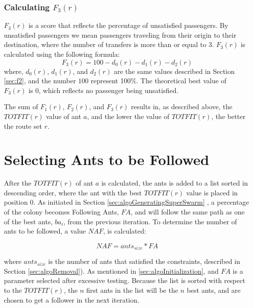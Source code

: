 \subsubsection{Calculating $F_{3}(r)$}
\label{sec:f3}
$F_3(r)$ is a score that reflects the percentage of unsatisfied passengers. By unsatisfied passengers we mean passengers traveling from their origin to their destination, where the number of transfers is more than or equal to 3. $F_3(r)$ is calculated using the following formula:
\newline
$$F_3(r) = 100 - d_0(r) - d_1(r) - d_2(r)$$
\newline
where, $d_0(r)$, $d_1(r)$, and $d_2(r)$ are the same values described in Section \vref{sec:f2}, and the number $100$ represent 100\%. The theoretical best value of $F_3(r)$ is 0, which reflects no passenger being unsatisfied. 

The sum of $F_{1}(r)$, $F_{2}(r)$, and $F_{3}(r)$ results in, as described above, the $TOTFIT(r)$ value of ant $a$, and the lower the value of $TOTFIT(r)$, the better the route set $r$. 

\section{Selecting Ants to be Followed}
\label{sec:selctingAntsToBeFollowed}

After the $TOTFIT(r)$ of ant $a$ is calculated, the ants is added to a list sorted in descending order, where the ant with the best $TOTFIT(r)$ value is placed in position 0. As initiated in Section \vref{sec:algoGeneratingSuperSwarm} , a percentage of the colony becomes Following Ants, $FA$, and will follow the same path as one of the best ants, $ba_i$, from the previous iteration. To determine the number of ants to be followed, a value $NAF$, is calculated:

$$NAF = ants_{size} * FA$$
 
where $ants_{size}$ is the number of ants that satisfied the constraints, described in Section \vref{sec:algoRemoval}). As mentioned in \vref{sec:algoInitialization}, and $FA$ is a parameter selected after excessive testing. Because the list is sorted with respect to the $TOTFIT(r)$, the $n$ first ants in the list will be the $n$ best ants, and are chosen to get a follower in the next iteration. 

